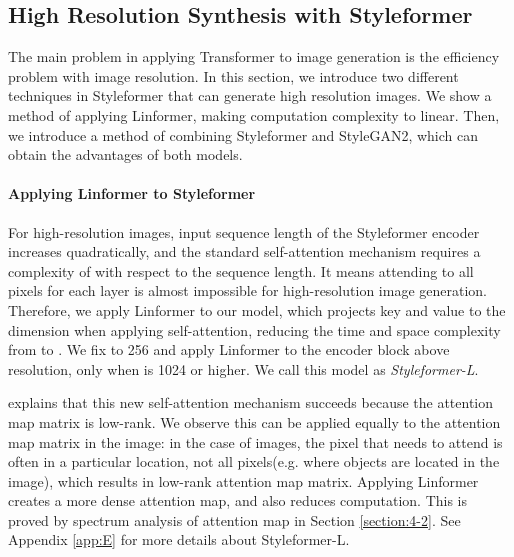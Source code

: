 \documentclass[10pt,twocolumn,letterpaper]{article}
\begin{document}
\subsection{High Resolution Synthesis with Styleformer}
\label{section:3-4}
The main problem in applying Transformer to image generation is the efficiency problem with image resolution. In this section, we introduce two different techniques in Styleformer that can generate high resolution images. We show a method of applying Linformer, making computation complexity to linear. Then, we introduce a method of combining Styleformer and StyleGAN2, which can obtain the advantages of both models.

\paragraph{Applying Linformer to Styleformer}
For high-resolution images, input sequence length of the Styleformer encoder increases quadratically, and the standard self-attention mechanism requires a complexity of  with respect to the sequence length. It means attending to all pixels for each layer is almost impossible for high-resolution image generation. Therefore, we apply Linformer \cite{wang2020linformer} to our model, which projects key and value to the  dimension when applying self-attention, reducing the time and space complexity from  to . We fix  to 256 and apply Linformer to the encoder block above  resolution, only when  is 1024 or higher. We call this model as \textit{Styleformer-L}. 

\cite{wang2020linformer} explains that this new self-attention mechanism succeeds because the attention map matrix is low-rank. We observe this can be applied equally to the attention map matrix in the image: in the case of images, the pixel that needs to attend is often in a particular location, not all pixels(e.g. where objects are located in the image), which results in low-rank attention map matrix. Applying Linformer creates a more dense attention map, and also reduces computation. This is proved by spectrum analysis of attention map in Section \ref{section:4-2}. See Appendix \ref{app:E} for more details about Styleformer-L.  
\end{document}
